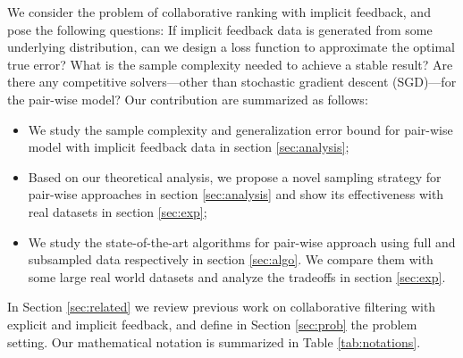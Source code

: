 \documentclass{article}
\numberwithin{equation}{section}
\newtheorem{sampling strategy}{Sampling Strategy}
\begin{document}
We consider the problem of collaborative ranking with implicit feedback, and pose the following questions: If implicit feedback data is generated
from some underlying distribution, can we design a loss function to approximate the optimal true error? What is the sample complexity needed to achieve a stable result? Are there any competitive solvers---other than stochastic gradient descent (SGD)---for the pair-wise model? Our contribution are summarized as follows: 
\begin{itemize}
    \item We study the sample complexity and generalization error bound for pair-wise model with implicit feedback data in section \ref{sec:analysis};
    \item Based on our theoretical analysis, we propose a novel sampling strategy for pair-wise approaches in section \ref{sec:analysis} and show its effectiveness with real datasets in section \ref{sec:exp};
    \item We study the state-of-the-art algorithms for pair-wise approach using full and subsampled data respectively in section \ref{sec:algo}. We compare them with some large real world datasets and analyze the tradeoffs in section \ref{sec:exp}.
\end{itemize}


In Section \ref{sec:related} we review previous work on collaborative filtering with explicit and implicit feedback, and define in Section \ref{sec:prob} the problem setting. 
Our mathematical notation is summarized in Table \ref{tab:notations}.


\end{document}
